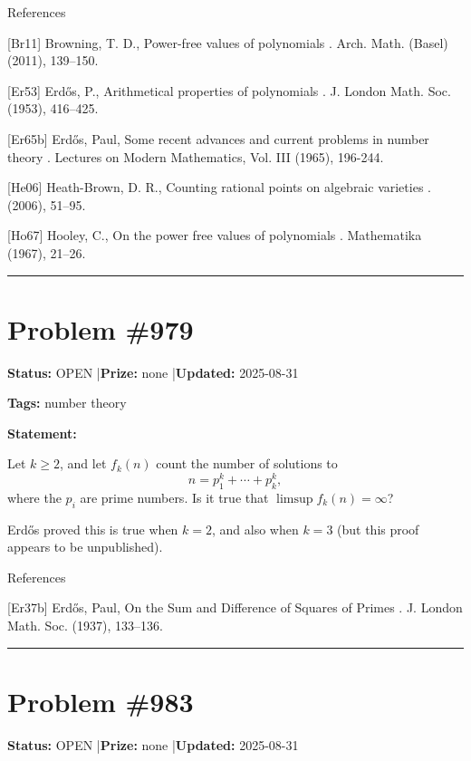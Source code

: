 \documentclass{article}
\begin{document}
References

[Br11] Browning, T. D., Power-free values of polynomials . Arch. Math. (Basel) (2011), 139--150.

[Er53] Erd\H{o}s, P., Arithmetical properties of polynomials . J. London Math. Soc. (1953), 416--425.

[Er65b] Erd\H{o}s, Paul, Some recent advances and current problems in number theory . Lectures on Modern Mathematics, Vol. III (1965), 196-244.

[He06] Heath-Brown, D. R., Counting rational points on algebraic varieties . (2006), 51--95.

[Ho67] Hooley, C., On the power free values of polynomials . Mathematika (1967), 21--26.

\noindent\rule{\linewidth}{0.4pt}


\section{Problem \#979}
\label{prob:979}

\noindent\textbf{Status:} OPEN \quad|\quad \textbf{Prize:} none \quad|\quad \textbf{Updated:} 2025-08-31

\noindent\textbf{Tags:} number theory

\medskip

\noindent\textbf{Statement:}

Let $k\geq 2$, and let $f_k(n)$ count the number of solutions to\[n=p_1^k+\cdots+p_k^k,\]where the $p_i$ are prime numbers. Is it true that $\limsup f_k(n)=\infty$?




Erd\H{o}s \cite{Er37b} proved this is true when $k=2$, and also when $k=3$ (but this proof appears to be unpublished).




References

[Er37b] Erd\H{o}s, Paul, On the Sum and {D}ifference of Squares of {P}rimes . J. London Math. Soc. (1937), 133--136.

\noindent\rule{\linewidth}{0.4pt}


\section{Problem \#983}
\label{prob:983}

\noindent\textbf{Status:} OPEN \quad|\quad \textbf{Prize:} none \quad|\quad \textbf{Updated:} 2025-08-31
\end{document}
